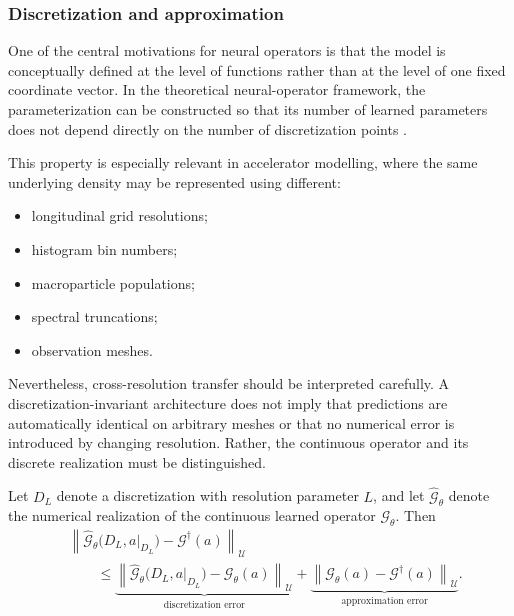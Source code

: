 \documentclass[11pt,a4paper]{article}
\providecommand{\norm}[1]{\left\lVert#1\right\rVert}
\begin{document}
\begin{sloppypar}
\subsubsection{Discretization and approximation}
\label{subsubsec:NO_discretization}

One of the central motivations for neural operators is that the model is conceptually defined at the level of functions rather than at the level of one fixed coordinate vector. In the theoretical neural-operator framework, the parameterization can be constructed so that its number of learned parameters does not depend directly on the number of discretization points \cite{kovachki_neural_2023}.

This property is especially relevant in accelerator modelling, where the same underlying density may be represented using different:

\begin{itemize}
\item longitudinal grid resolutions;
\item histogram bin numbers;
\item macroparticle populations;
\item spectral truncations;
\item observation meshes.
\end{itemize}

Nevertheless, cross-resolution transfer should be interpreted carefully. A discretization-invariant architecture does not imply that predictions are automatically identical on arbitrary meshes or that no numerical error is introduced by changing resolution. Rather, the continuous operator and its discrete realization must be distinguished.

Let $D_L$ denote a discretization with resolution parameter $L$, and let
$\widehat{\mathcal{G}}_{\theta}$
denote the numerical realization of the continuous learned operator
$\mathcal{G}_{\theta}$.
Then
\begin{equation}
\begin{split}
&
\norm{
\widehat{\mathcal{G}}_{\theta}
\bigl(
D_L,
a|_{D_L}
\bigr)
-
\mathcal{G}^{\dagger}(a)
}_{\mathcal{U}}
\\
&\qquad\le
\underbrace{
\norm{
\widehat{\mathcal{G}}_{\theta}
\bigl(
D_L,
a|_{D_L}
\bigr)
-
\mathcal{G}_{\theta}(a)
}_{\mathcal{U}}
}_{\text{discretization error}}
+
\underbrace{
\norm{
\mathcal{G}_{\theta}(a)
-
\mathcal{G}^{\dagger}(a)
}_{\mathcal{U}}
}_{\text{approximation error}}.
\end{split}
\label{eq:NO_error_decomp}
\end{equation}


\end{sloppypar}
\end{document}
